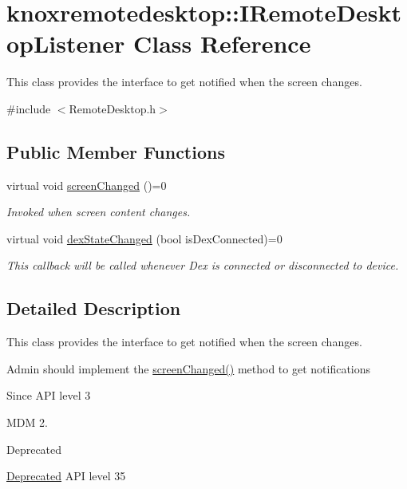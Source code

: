\hypertarget{classknoxremotedesktop_1_1IRemoteDesktopListener}{\section{knoxremotedesktop\-:\-:\-I\-Remote\-Desktop\-Listener \-Class \-Reference}
\label{classknoxremotedesktop_1_1IRemoteDesktopListener}
}


\-This class provides the interface to get notified when the screen changes.  




{\ttfamily \#include $<$\-Remote\-Desktop.\-h$>$}

\subsection*{\-Public \-Member \-Functions}
\begin{DoxyCompactItemize}
\item 
virtual void \hyperlink{classknoxremotedesktop_1_1IRemoteDesktopListener_a737ab352cec0a7dc249da5519a8e14b0}{screen\-Changed} ()=0
\begin{DoxyCompactList}\small\item\em \-Invoked when screen content changes. \end{DoxyCompactList}\item 
virtual void \hyperlink{classknoxremotedesktop_1_1IRemoteDesktopListener_a95792f292e2b278e42e50da4d96d532c}{dex\-State\-Changed} (bool is\-Dex\-Connected)=0
\begin{DoxyCompactList}\small\item\em \-This callback will be called whenever \-Dex is connected or disconnected to device. \end{DoxyCompactList}\end{DoxyCompactItemize}


\subsection{\-Detailed \-Description}
\-This class provides the interface to get notified when the screen changes. 

\-Admin should implement the \hyperlink{classknoxremotedesktop_1_1IRemoteDesktopListener_a737ab352cec0a7dc249da5519a8e14b0}{screen\-Changed()} method to get notifications

\begin{DoxySince}{\-Since}
\-A\-P\-I level 3

\-M\-D\-M 2.
\end{DoxySince}
\begin{DoxyRefDesc}{\-Deprecated}
\item[\hyperlink{deprecated__deprecated000011}{\-Deprecated}]\-A\-P\-I level 35\end{DoxyRefDesc}



